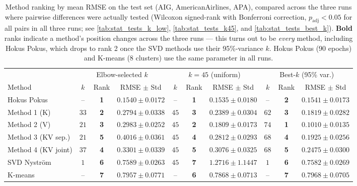 \begin{table}[ht]
\centering
\small
\caption{Method ranking by mean RMSE on the test set (AIG, AmericanAirlines, APA),
compared across the three runs where pairwise differences were actually tested
(Wilcoxon signed-rank with Bonferroni correction, $p_\text{adj} < 0.05$ for all
pairs in all three runs; see \autoref{tab:stat_tests_k_low}, \autoref{tab:stat_tests_k45},
and \autoref{tab:stat_tests_best_k}). \textbf{Bold} ranks indicate a method's position
changes across the three runs --- this turns out to be \emph{every} method, including
Hokus Pokus, which drops to rank 2 once the SVD methods use their 95\%-variance $k$.
Hokus Pokus (90 epochs) and K-means (8 clusters) use the same parameter in all runs.}
\label{tab:ranking}
\begin{tabular}{l ccc ccc ccc}
\toprule
& \multicolumn{3}{c}{Elbow-selected $k$} & \multicolumn{3}{c}{$k = 45$ (uniform)} & \multicolumn{3}{c}{Best-$k$ (95\% var.)} \\
\cmidrule(lr){2-4} \cmidrule(lr){5-7} \cmidrule(lr){8-10}
Method & $k$ & Rank & RMSE $\pm$ Std & $k$ & Rank & RMSE $\pm$ Std & $k$ & Rank & RMSE $\pm$ Std \\
\midrule
Hokus Pokus         & --   & \textbf{1} & $0.1540 \pm 0.0172$ & --   & \textbf{1} & $0.1535 \pm 0.0180$ & --   & \textbf{2} & $0.1541 \pm 0.0173$ \\
Method 1 (K)        & $33$ & \textbf{2} & $0.2794 \pm 0.0338$ & $45$ & \textbf{3} & $0.2389 \pm 0.0304$ & $62$ & \textbf{3} & $0.1819 \pm 0.0282$ \\
Method 2 (V)        & $21$ & \textbf{3} & $0.2983 \pm 0.0252$ & $45$ & \textbf{2} & $0.1809 \pm 0.0173$ & $74$ & \textbf{1} & $0.1010 \pm 0.0135$ \\
Method 3 (KV sep.)  & $21$ & \textbf{5} & $0.4016 \pm 0.0361$ & $45$ & \textbf{4} & $0.2812 \pm 0.0293$ & $68$ & \textbf{4} & $0.1925 \pm 0.0256$ \\
Method 4 (KV joint) & $37$ & \textbf{4} & $0.3301 \pm 0.0339$ & $45$ & \textbf{5} & $0.3076 \pm 0.0325$ & $68$ & \textbf{5} & $0.2475 \pm 0.0300$ \\
SVD Nyström         & $1$  & \textbf{6} & $0.7589 \pm 0.0263$ & $45$ & \textbf{7} & $1.2716 \pm 1.1447$ & $1$  & \textbf{6} & $0.7582 \pm 0.0269$ \\
K-means             & --   & \textbf{7} & $0.7957 \pm 0.0771$ & --   & \textbf{6} & $0.7868 \pm 0.0713$ & --   & \textbf{7} & $0.7968 \pm 0.0705$ \\
\bottomrule
\end{tabular}
\end{table}

